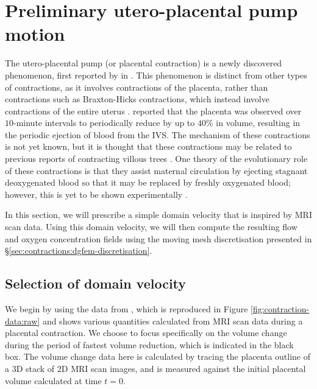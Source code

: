     \section{Preliminary utero-placental pump motion} \label{sec:contractions:placenta}
        The utero-placental pump (or placental contraction) is a newly discovered phenomenon, first reported by \citeauthor{dellschaftHaemodynamicsHumanPlacenta2020} \cite{dellschaftHaemodynamicsHumanPlacenta2020} in \citeyear{dellschaftHaemodynamicsHumanPlacenta2020}. This phenomenon is distinct from other types of contractions, as it involves contractions of the placenta, rather than contractions such as Braxton-Hicks contractions, which instead involve contractions of the entire uterus \cite{togashiSustainedUterineContractions1993}. \citeauthor{dellschaftHaemodynamicsHumanPlacenta2020} \cite{dellschaftHaemodynamicsHumanPlacenta2020} reported that the placenta was observed over $10$-minute intervals to periodically reduce by up to $40\%$ in volume, resulting in the periodic ejection of blood from the IVS. The mechanism of these contractions is not yet known, but it is thought that these contractions may be related to previous reports of contracting villous trees \cite{farleyContractilePropertiesHuman2004,dellschaftHaemodynamicsHumanPlacenta2020}. One theory of the evolutionary role of these contractions is that they assist maternal circulation by ejecting stagnant deoxygenated blood so that it may be replaced by freshly oxygenated blood; however, this is yet to be shown experimentally \cite{dellschaftHaemodynamicsHumanPlacenta2020}.

        In this section, we will prescribe a simple domain velocity that is inspired by MRI scan data. Using this domain velocity, we will then compute the resulting flow and oxygen concentration fields using the moving mesh discretisation presented in \S\ref{sec:contractions:dgfem-discretisation}.

        \subsection{Selection of domain velocity} \label{sec:contractions:placenta:mesh-velocity}
            We begin by using the data from \citeauthor{gowlandCharacterisingPlacentalContractions2024} \cite{gowlandCharacterisingPlacentalContractions2024}, which is reproduced in Figure \ref{fig:contraction-data:raw} and shows various quantities calculated from MRI scan data during a placental contraction. We choose to focus specifically on the volume change during the period of fastest volume reduction, which is indicated in the black box. The volume change data here is calculated by tracing the placenta outline of a 3D stack of 2D MRI scan images, and is measured against the initial placental volume calculated at time $t = 0$.

